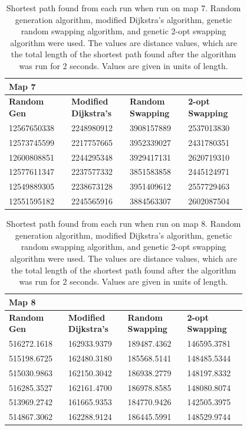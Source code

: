 \documentclass{article}
\begin{document}
\begin{appendices}
\begin{table}[H]
    \caption{Shortest path found from each run when run on map 7. Random generation algorithm, modified Dijkstra's algorithm, genetic random swapping algorithm, and genetic 2-opt swapping algorithm were used. The values are distance values, which are the total length of the shortest path found after the algorithm was run for 2 seconds. Values are given in units of length.}
    \centering
    \begin{tabular}{|p{0.2\linewidth}|p{0.2\linewidth}|p{0.2\linewidth}|p{0.2\linewidth}|}
    \hline
        \textbf{Map 7} & ~ & ~ & ~ \\ \hline
        \textbf{Random Gen} & \textbf{Modified Dijkstra's} & \textbf{Random Swapping} & \textbf{2-opt Swapping} \\ \hline
        12567650338 & 2248980912 & 3908157889 & 2537013830 \\ \hline
        12573745599 & 2217757665 & 3952339027 & 2431780351 \\ \hline
        12600808851 & 2244295348 & 3929417131 & 2620719310 \\ \hline
        12577611347 & 2237577332 & 3851583858 & 2445124971 \\ \hline
        12549889305 & 2238673128 & 3951409612 & 2557729463 \\ \hline
        12551595182 & 2245565916 & 3884563307 & 2602087504 \\ \hline
    \end{tabular}
\end{table}

\begin{table}[H]
    \caption{Shortest path found from each run when run on map 8. Random generation algorithm, modified Dijkstra's algorithm, genetic random swapping algorithm, and genetic 2-opt swapping algorithm were used. The values are distance values, which are the total length of the shortest path found after the algorithm was run for 2 seconds. Values are given in units of length.}
    \centering
    \begin{tabular}{|p{0.2\linewidth}|p{0.2\linewidth}|p{0.2\linewidth}|p{0.2\linewidth}|}
    \hline
        \textbf{Map 8} & ~ & ~ & ~ \\ \hline
        \textbf{Random Gen} & \textbf{Modified Dijkstra's} & \textbf{Random Swapping} & \textbf{2-opt Swapping} \\ \hline
        516272.1618 & 162933.9379 & 189487.4362 & 146595.3781 \\ \hline
        515198.6725 & 162480.3180 & 185568.5141 & 148485.5344 \\ \hline
        515030.9863 & 162150.3042 & 186938.2779 & 148197.8332 \\ \hline
        516285.3527 & 162161.4700 & 186978.8585 & 148080.8074 \\ \hline
        513969.2742 & 161665.9353 & 184770.9426 & 142505.3975 \\ \hline
        514867.3062 & 162288.9124 & 186445.5991 & 148529.9744 \\ \hline
    \end{tabular}
\end{table}


\end{appendices}
\end{document}
